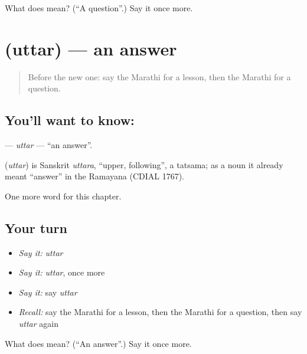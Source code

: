 \begin{tcolorbox}[breakable,colback=teal!4,colframe=teal!35!black,title={Before you move on}]
What does  mean? (\textquotedblleft{}A question\textquotedblright{}.) Say it once more.
\end{tcolorbox}
\section[\texorpdfstring{\mr{उत्तर} (uttar)}{उत्तर (uttar)}]{ (uttar) — an answer}

\label{lesson:MR-C94-uttar}



\begin{quote}
Before the new one: say the Marathi for a lesson, then the Marathi for a question.
\end{quote}

\subsection*{You'll want to know: }
\textbf{} — \emph{uttar} — \textquotedblleft{}an answer\textquotedblright{}.

\begin{cousinweb}
\textbf{} (\emph{uttar}) is Sanskrit \emph{uttara}, \textquotedblleft{}upper, following\textquotedblright{}, a tatsama; as a noun it already meant \textquotedblleft{}answer\textquotedblright{} in the Ramayana (CDIAL 1767).
\end{cousinweb}

\begin{grammarlens}[title={What you've built}]
One more word for this chapter.
\end{grammarlens}

\subsection*{Your turn}
\begin{itemize}
\raggedright
  \item \emph{Say it:} \emph{uttar}
  \item \emph{Say it:} \emph{uttar}, once more
  \item \emph{Say it:} say \emph{uttar}
  \item \emph{Recall:} say the Marathi for a lesson, then the Marathi for a question, then say \emph{uttar} again
\end{itemize}

\begin{tcolorbox}[breakable,colback=teal!4,colframe=teal!35!black,title={Before you move on}]
What does  mean? (\textquotedblleft{}An answer\textquotedblright{}.) Say it once more.
\end{tcolorbox}
